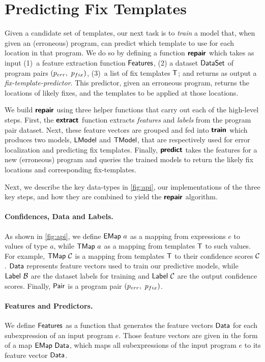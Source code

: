 \section{Predicting Fix Templates}
\label{sec:templ-pred}

Given a candidate set of templates, our next task is to \emph{train} a model
that, when given an (erroneous) program, can predict which template to use for
each location in that program.
%
We do so by defining a function $\bm{\mathsf{repair}}$ which takes as input
%
(1)~a feature extraction function $\mathsf{Features}$,
%
(2) a dataset $\mathsf{DataSet}$ of program pairs $(p_{err},\ p_{fix})$,
%
(3)~a list of fix templates $\mathsf{T}$;
%
and returns as output a \emph{fix-template-predictor}. This predictor, given an
erroneous program, returns the locations of likely fixes, and the templates to
be applied at those locations.

We build $\bm{\mathsf{repair}}$ using three helper functions that carry out each of the
high-level steps.
%
First, the $\bm{\mathsf{extract}}$ function extracts \emph{features} and \emph{labels}
from the program pair dataset. Next, these feature vectors are grouped and fed
into $\bm{\mathsf{train}}$ which produces two models, $\mathsf{LModel}$ and $\mathsf{TModel}$, that are
respectively used for error localization and predicting fix templates.
%
Finally, $\bm{\mathsf{predict}}$ takes the features for a new (erroneous) program and
queries the trained models to return the likely fix locations and corresponding
fix-templates.

Next, we describe the key data-types in \autoref{fig:api}, our implementations
of the three key steps, and how they are combined to yield the $\bm{\mathsf{repair}}$
algorithm.

\paragraph{Confidences, Data and Labels.}
As shown in \autoref{fig:api}, we define $\mathsf{EMap}\ a$ as a mapping from
expressions $e$ to values of type $a$, while $\mathsf{TMap}\ a$ as a mapping from
templates $\mathsf{T}$ to such values. For example, $\mathsf{TMap}\ \mathcal{C}$ is a mapping from
templates $\mathsf{T}$ to their confidence scores $\mathcal{C}$. $\mathsf{Data}$ represents feature
vectors used to train our predictive models, while $\mathsf{Label}\ \mathcal{B}$ are the
dataset labels for training and $\mathsf{Label}\ \mathcal{C}$ are the output confidence
scores. Finally, $\mathsf{Pair}$ is a program pair $(p_{err},\ p_{fix})$.

\paragraph{Features and Predictors.}
We define $\mathsf{Features}$ as a function that generates the feature vectors
$\mathsf{Data}$ for each subexpression of an input program $e$. Those feature vectors
are given in the form of a map $\mathsf{EMap}\ \mathsf{Data}$, which maps all subexpressions
of the input program $e$ to its feature vector $\mathsf{Data}$.

